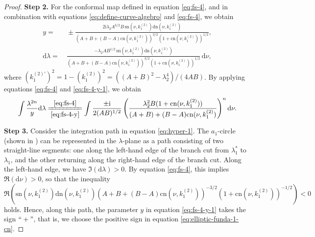 \documentclass[11pt,reqno]{amsart}
\newcommand{\ii}{\mathrm{i}}
\newcommand{\sn}{\mathrm{sn}}
\newcommand{\cn}{\mathrm{cn}}
\newcommand{\dn}{\mathrm{dn}}
\newcommand{\dd}{\mathrm{d}}
\numberwithin{equation}{section}
\begin{document}
\begin{proof}
	
	\textbf{Step 2.}
	For the conformal map defined in equation \eqref{eq:fs-4}, and in combination with equations \eqref{eq:define-curve-algebro} and \eqref{eq:fs-4}, we obtain 
	\begin{subequations}\label{eq:fs-4-y}
		\begin{align}
			y=&\ \pm \frac{2\ii \lambda_2A^{3/2} B \, \sn(\nu,  k^{(2)}_1) \dn(\nu,  k^{(2)}_1)}{(A+B+(B-A)\cn(\nu,  k^{(2)}_1))^{3/2}(1+\cn(\nu,  k^{(2)}_1))^{1/2}},\label{eq:fs-4-y-1}\\
			\dd \lambda =&\  \frac{-\lambda_2 A B^{1/2} \, \sn(\nu,  k^{(2)}_1)\dn(\nu,  k^{(2)}_1)}{(A+B+(B-A)\cn(\nu,  k^{(2)}_1))^{3/2}(1+\cn(\nu,  k^{(2)}_1))^{1/2}} \, \dd \nu ,\label{eq:fs-4-y-2}
		\end{align}
	\end{subequations}
	where $(k^{(2)\prime }_1)^2=1-  (k^{(2)}_1)^2=((A+B)^2-\lambda_2^4)/(4AB)$.
	By applying equations \eqref{eq:fs-4} and \eqref{eq:fs-4-y-1}, we obtain 
	\begin{equation}\label{eq:elliptic-funda-1-cn}
		\begin{split}
			 \int \frac{\lambda^{2n}}{y}\dd \lambda
			\xlongequal[\eqref{eq:fs-4-y}]{\eqref{eq:fs-4}}  \int \frac{\pm \ii}{2(AB)^{1/2}} \left(\frac{\lambda_2^2B(1+\cn(\nu,  k^{(2)}_1))}{(A+B)+(B-A)\cn(\nu,  k^{(2)}_1)}\right)^n \dd \nu.
		\end{split}
	\end{equation}
	
	
	\textbf{Step 3.}
	Consider the integration path in equation \eqref{eq:hyper-1}.
	The $a_1$-circle (shown in ) can be represented in the $\lambda$-plane as a path consisting of two straight-line segments: one along the left-hand edge of the branch cut from $\lambda_1^*$ to $\lambda_1$, and the other returning along the right-hand edge of the branch cut.
	Along the left-hand edge, we have $\Im(\dd \lambda)>0$. 
	By equation \eqref{eq:fs-4}, this implies $\Re(\dd \nu)>0$, so that the inequality $\Re( \sn(\nu,  k^{(2)}_1)\dn(\nu,  k^{(2)}_1)(A+B+(B-A)\cn(\nu,  k^{(2)}_1))^{-3/2}(1+\cn(\nu,  k^{(2)}_1))^{-1/2})<0$	holds.
	Hence, along this path, the parameter $y$ in equation \eqref{eq:fs-4-y-1} takes the sign $``+ "$, that is, we choose the positive sign in equation \eqref{eq:elliptic-funda-1-cn}.
	

\end{proof}
\end{document}
